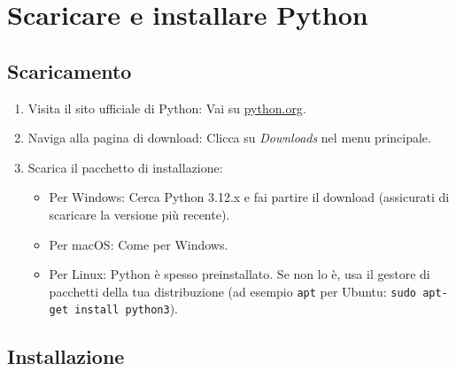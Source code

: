 \documentclass[
  letterpaper,
  DIV=11,
  numbers=noendperiod]{scrreprt}
\providecommand{\tightlist}{%
  \setlength{\itemsep}{0pt}\setlength{\parskip}{0pt}}\usepackage{longtable,booktabs,array}
\begin{document}
\chapter{Scaricare e installare
Python}\label{scaricare-e-installare-python}

\section{Scaricamento}\label{scaricamento}

\begin{enumerate}
\def\labelenumi{\arabic{enumi}.}
\tightlist
\item
  Visita il sito ufficiale di Python: Vai su
  \href{https://www.python.org/}{python.org}.
\item
  Naviga alla pagina di download: Clicca su \emph{Downloads} nel menu
  principale.
\item
  Scarica il pacchetto di installazione:

  \begin{itemize}
  \tightlist
  \item
    Per Windows: Cerca Python 3.12.x e fai partire il download
    (assicurati di scaricare la versione più recente).
  \item
    Per macOS: Come per Windows.
  \item
    Per Linux: Python è spesso preinstallato. Se non lo è, usa il
    gestore di pacchetti della tua distribuzione (ad esempio
    \texttt{apt} per Ubuntu: \texttt{sudo\ apt-get\ install\ python3}).
  \end{itemize}
\end{enumerate}

\section{Installazione}\label{installazione}
\end{document}
